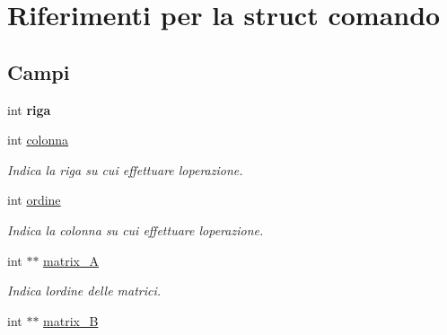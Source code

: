 \hypertarget{structcomando}{}\section{Riferimenti per la struct comando}
\label{structcomando}
\subsection*{Campi}
\begin{DoxyCompactItemize}
\item 
int {\bfseries riga}\hypertarget{structcomando_a7a9e6f48e6423a1fd1da2f9b62a3d600}{}\label{structcomando_a7a9e6f48e6423a1fd1da2f9b62a3d600}

\item 
int \hyperlink{structcomando_a28e6ec08b9bbaaf72321ddebcadc0a76}{colonna}\hypertarget{structcomando_a28e6ec08b9bbaaf72321ddebcadc0a76}{}\label{structcomando_a28e6ec08b9bbaaf72321ddebcadc0a76}

\begin{DoxyCompactList}\small\item\em Indica la riga su cui effettuare l\textquotesingle{}operazione. \end{DoxyCompactList}\item 
int \hyperlink{structcomando_a0c6d0595cab2eb118ae7996528a42e49}{ordine}\hypertarget{structcomando_a0c6d0595cab2eb118ae7996528a42e49}{}\label{structcomando_a0c6d0595cab2eb118ae7996528a42e49}

\begin{DoxyCompactList}\small\item\em Indica la colonna su cui effettuare l\textquotesingle{}operazione. \end{DoxyCompactList}\item 
int $\ast$$\ast$ \hyperlink{structcomando_aa3500fb248efc740cd98546da3065603}{matrix\+\_\+A}\hypertarget{structcomando_aa3500fb248efc740cd98546da3065603}{}\label{structcomando_aa3500fb248efc740cd98546da3065603}

\begin{DoxyCompactList}\small\item\em Indica l\textquotesingle{}ordine delle matrici. \end{DoxyCompactList}\item 
int $\ast$$\ast$ \hyperlink{structcomando_a0a88284394c397d5552d5be2219c28bd}{matrix\+\_\+B}\hypertarget{structcomando_a0a88284394c397d5552d5be2219c28bd}{}\label{structcomando_a0a88284394c397d5552d5be2219c28bd}


\end{DoxyCompactItemize}
